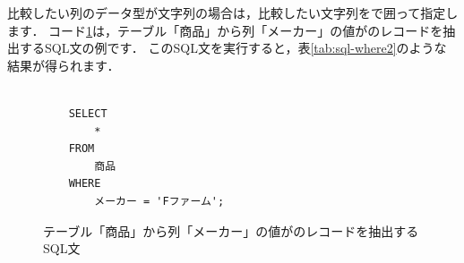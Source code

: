 比較したい列のデータ型が文字列の場合は，比較したい文字列をで囲って指定します．
コード\ref{code:sql-where2}は，テーブル「商品」から列「メーカー」の値がのレコードを抽出するSQL文の例です．
このSQL文を実行すると，表\ref{tab:sql-where2}のような結果が得られます．
\begin{figure}[!htbp]
    \begin{verbatim}

    SELECT
        *
    FROM
        商品
    WHERE
        メーカー = 'Fファーム';

    \end{verbatim}
    \captionsetup{name=コード}
    \caption{テーブル「商品」から列「メーカー」の値がのレコードを抽出するSQL文}
    \label{code:sql-where2}
\end{figure}
\begin{table}[!htbp]
    \centering
    \caption{テーブル「商品」から列「メーカー」の値がのレコードを抽出した結果}
    \label{tab:sql-where2}
\end{table}

